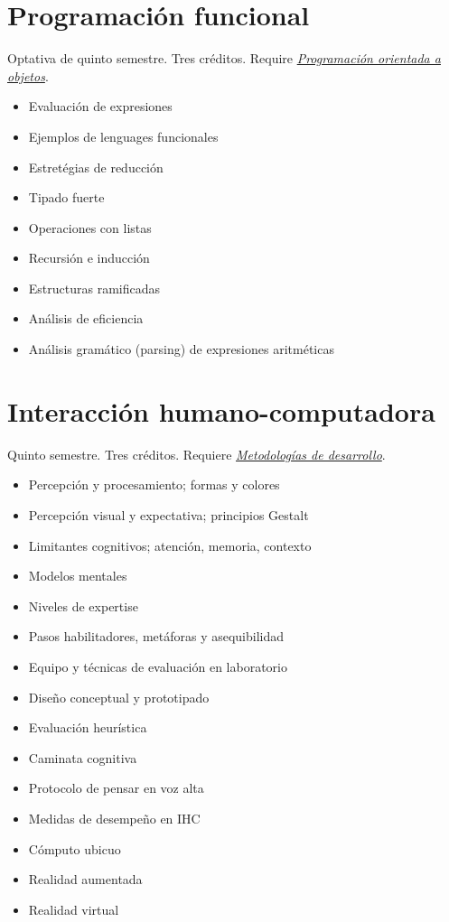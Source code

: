 \documentclass{article}
\begin{document}
\begin{multicols}{4}
\vfill\null \columnbreak

\hypertarget{pf}{\section*{Programaci\'{o}n funcional}}

Optativa de quinto semestre. Tres cr\'{e}ditos. Require
\hyperlink{poao}{\em Programaci\'{o}n orientada a objetos}.

\begin{itemize}
\item{Evaluaci\'{o}n de expresiones}
\item{Ejemplos de lenguages funcionales}
\item{Estret\'{e}gias de reducci\'{o}n}
\item{Tipado fuerte}
\item{Operaciones con listas}
\item{Recursi\'{o}n e inducci\'{o}n}
\item{Estructuras ramificadas}
\item{An\'{a}lisis de eficiencia}
\item{An\'{a}lisis gram\'{a}tico (parsing) de expresiones aritm\'{e}ticas}
\end{itemize}

\newpage

\hypertarget{ihc}{\section*{Interacci\'{o}n humano-computadora}}   

Quinto semestre. Tres cr\'{e}ditos. Requiere \hyperlink{mdd}{\em
  Metodolog\'{i}as de desarrollo}.

\begin{itemize}
\item{Percepci\'{o}n y procesamiento; formas y colores}
\item{Percepci\'{o}n visual y expectativa; principios Gestalt}
\item{Limitantes cognitivos; atenci\'{o}n, memoria, contexto}
\item{Modelos mentales}
\item{Niveles de expertise}
\item{Pasos habilitadores, met\'{a}foras y asequibilidad}
\item{Equipo y t\'{e}cnicas de evaluaci\'{o}n en laboratorio}
\item{Dise\~{n}o conceptual y prototipado}
\item{Evaluaci\'{o}n heur\'{i}stica}
\item{Caminata cognitiva}
\item{Protocolo de pensar en voz alta}
\item{Medidas de desempe\~{n}o en IHC}
\item{C\'{o}mputo ubicuo}
\item{Realidad aumentada}
\item{Realidad virtual}
\end{itemize}


\end{multicols}
\end{document}
